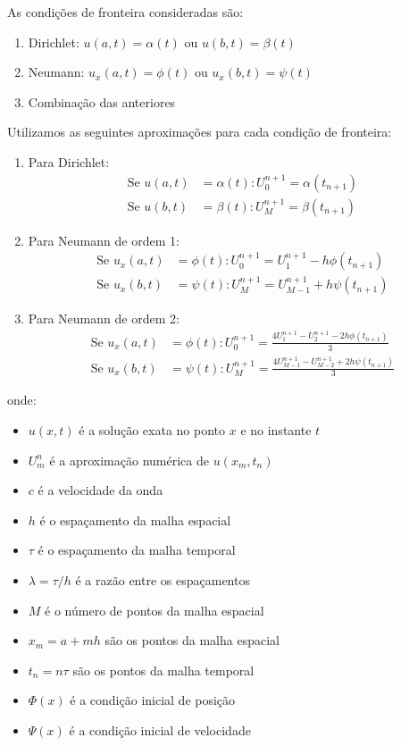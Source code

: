 \documentclass[column,amsmath,amssymb,floatfix]{revtex4}
\begin{document}
As condições de fronteira consideradas são:
\begin{enumerate}[label=\roman*.]
	\item Dirichlet: $u(a,t) = \alpha(t)$ ou $u(b,t) = \beta(t)$
	\item Neumann: $u_x(a,t) = \phi(t)$ ou $u_x(b,t) = \psi(t)$
	\item Combinação das anteriores
\end{enumerate}

Utilizamos as seguintes aproximações para cada condição de fronteira:
\begin{enumerate}[label=\roman*.]
	\item Para Dirichlet:
	      \begin{align}
	      	\text{Se } u(a,t) & = \alpha(t): U_0^{n+1} = \alpha(t_{n+1}) \label{eq:dirichlet-a} \\
	      	\text{Se } u(b,t) & = \beta(t): U_M^{n+1} = \beta(t_{n+1}) \label{eq:dirichlet-b}   
	      \end{align}
	\item Para Neumann de ordem 1:
	      \begin{align}
	      	\text{Se } u_x(a,t) & = \phi(t): U_0^{n+1} = U_1^{n+1} - h\phi(t_{n+1}) \label{eq:neumman-1-a}     \\
	      	\text{Se } u_x(b,t) & = \psi(t): U_M^{n+1} = U_{M-1}^{n+1} + h\psi(t_{n+1}) \label{eq:neumman-1-b} 
	      \end{align}
	      	      	      	      
	\item Para Neumann de ordem 2:
	      \begin{align}
	      	\text{Se } u_x(a,t) & = \phi(t): U_0^{n+1} = \frac{4U_1^{n+1} - U_2^{n+1} - 2h\phi(t_{n+1})}{3}\label{eq:neumman-2-a}         \\
	      	\text{Se } u_x(b,t) & = \psi(t): U_M^{n+1} = \frac{4U_{M-1}^{n+1} - U_{M-2}^{n+1} + 2h\psi(t_{n+1})}{3}\label{eq:neumman-2-b} 
	      \end{align}    
\end{enumerate}

onde:
\begin{itemize}
	\item $u(x,t)$ é a solução exata no ponto $x$ e no instante $t$
	\item $U_m^n$ é a aproximação numérica de $u(x_m,t_n)$
	\item $c$ é a velocidade da onda
	\item $h$ é o espaçamento da malha espacial
	\item $\tau$ é o espaçamento da malha temporal
	\item $\lambda = \tau/h$ é a razão entre os espaçamentos
	\item $M$ é o número de pontos da malha espacial
	\item $x_m = a + mh$ são os pontos da malha espacial
	\item $t_n = n\tau$ são os pontos da malha temporal
	\item $\Phi(x)$ é a condição inicial de posição
	\item $\Psi(x)$ é a condição inicial de velocidade
\end{itemize}
\end{document}
